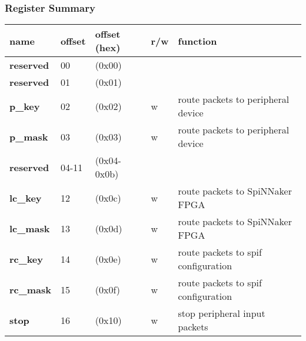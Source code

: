 \documentclass[11pt,a4paper,twoside]{article}
\begin{document}
\subsubsection*{Register Summary}


\begin{center}
\begin{table}[!h]
	\begin{tabularx}{\textwidth}{| p{34mm} p{13mm} p{21mm} p{7mm} X |}
		\hline
		\textbf{name}                        & \textbf{offset}           & \textbf{offset} (hex)           & \textbf{r/w}        & \textbf{function} \\%
		\hline
		\hline
		\cellcolor{gray!25}\textbf{reserved} & \cellcolor{gray!25}00     & \cellcolor{gray!25}(0x00)       & \cellcolor{gray!25} & \cellcolor{gray!25}\\%
		\cellcolor{gray!25}\textbf{reserved} & \cellcolor{gray!25}01     & \cellcolor{gray!25}(0x01)       & \cellcolor{gray!25} & \cellcolor{gray!25}\\%
		\textbf{p\_key}                      & 02                        & (0x02)                          & w                   & route packets to peripheral device             \\%
		\textbf{p\_mask}                     & 03                        & (0x03)                          & w                   & route packets to peripheral device             \\%
		\cellcolor{gray!25}\textbf{reserved} & \cellcolor{gray!25}04-11  & \cellcolor{gray!25} (0x04-0x0b) & \cellcolor{gray!25} & \cellcolor{gray!25}\\%
		\textbf{lc\_key}                     & 12                        & (0x0c)                          & w                   & route packets to SpiNNaker FPGA  \\%
		\textbf{lc\_mask}                    & 13                        & (0x0d)                          & w                   & route packets to SpiNNaker FPGA  \\%
		\textbf{rc\_key}                     & 14                        & (0x0e)                          & w                   & route packets to spif configuration   \\%
		\textbf{rc\_mask}                    & 15                        & (0x0f)                          & w                   & route packets to spif configuration   \\%
		\textbf{stop}                        & 16                        & (0x10)                          & w                   & stop peripheral input packets         \\%

\end{tabularx}
\end{table}
\end{center}
\end{document}

